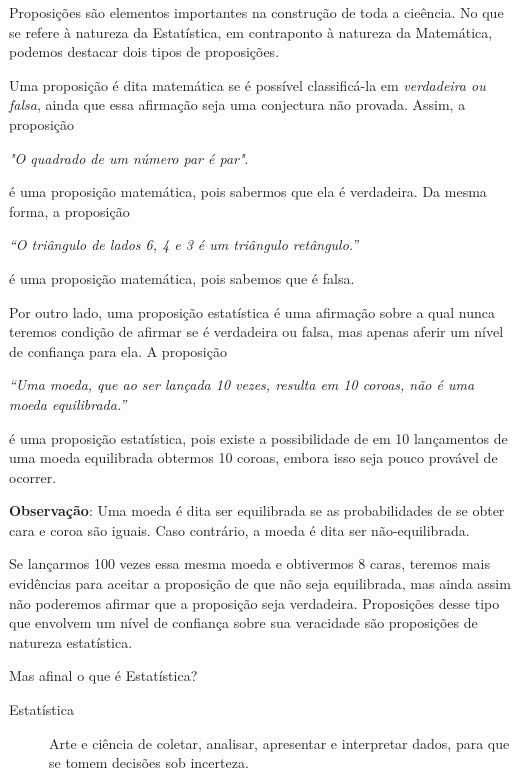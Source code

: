\begin{reflection}

Proposições são elementos importantes na construção de toda a cieência. No que se refere à natureza da Estatística, em contraponto à natureza da Matemática, podemos destacar dois tipos de proposições.

Uma proposição é dita matemática se é possível classificá-la em \textit{verdadeira ou falsa}, ainda que essa afirmação seja uma conjectura não provada. Assim, a proposição

\textit{"O quadrado de um número par é par"}.

é uma proposição matemática, pois sabermos que ela é verdadeira. Da mesma forma, a proposição

\textit{“O triângulo de lados 6, 4 e 3 é um triângulo retângulo.”}

é uma proposição matemática, pois sabemos que é falsa.

Por outro lado, uma proposição estatística é uma afirmação sobre a qual nunca teremos condição de afirmar se é verdadeira ou falsa, mas apenas aferir um nível de confiança para ela. A proposição

\textit{“Uma moeda, que ao ser lançada 10 vezes, resulta em 10 coroas, não é uma moeda equilibrada.”}

é uma proposição estatística, pois existe a possibilidade de em 10 lançamentos de uma moeda equilibrada obtermos 10 coroas, embora isso seja pouco provável de ocorrer.

\textbf{Observação}: Uma moeda é dita ser equilibrada se as probabilidades de se obter cara e coroa são iguais. Caso contrário, a moeda é dita ser não-equilibrada.

Se lançarmos 100 vezes essa mesma moeda e obtivermos 8 caras, teremos mais evidências para aceitar a proposição de que não seja equilibrada, mas ainda assim não poderemos afirmar que a proposição seja verdadeira. Proposições desse tipo que envolvem um nível de confiança sobre sua veracidade são proposições de natureza estatística.

\end{reflection}

Mas afinal o que é Estatística?

\begin{description}
\item[{Estatística}] \leavevmode{}\label{est1-def-1}
Arte e ciência de coletar, analisar, apresentar e interpretar dados, para que se tomem decisões sob incerteza.
\end{description}

